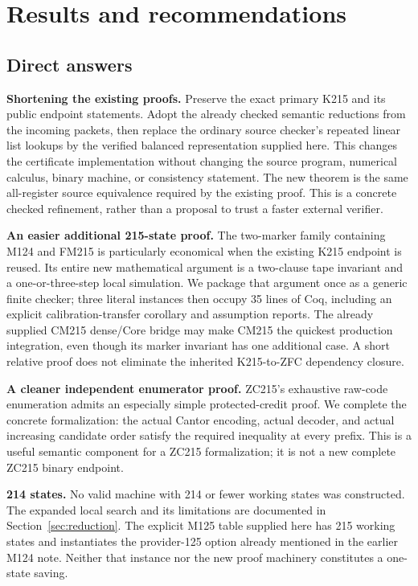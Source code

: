 \section{Results and recommendations}

\subsection{Direct answers}

\textbf{Shortening the existing proofs.} Preserve the exact primary K215 and
its public endpoint statements. Adopt the already checked semantic reductions
from the incoming packets, then replace the ordinary source checker's repeated
linear list lookups by the verified balanced representation supplied here.
This changes the certificate implementation without changing the source
program, numerical calculus, binary machine, or consistency statement.
The new theorem is the same all-register source equivalence required by the
existing proof. This is a concrete checked refinement, rather than a proposal
to trust a faster external verifier.

\textbf{An easier additional 215-state proof.} The two-marker family containing
M124 and FM215 is particularly economical when the existing K215 endpoint is
reused. Its entire new mathematical argument is a two-clause tape invariant
and a one-or-three-step local simulation. We package that argument once as
a generic finite checker; three literal instances then occupy 35 lines of
Coq, including an explicit calibration-transfer corollary and assumption
reports. The already supplied CM215 dense/Core bridge may make CM215 the
quickest production integration, even though its marker invariant has one
additional case. A short relative proof does not eliminate the inherited
K215-to-ZFC dependency closure.

\textbf{A cleaner independent enumerator proof.} ZC215's exhaustive raw-code
enumeration admits an especially simple protected-credit proof. We complete
the concrete formalization: the actual Cantor encoding, actual decoder, and
actual increasing candidate order satisfy the required inequality at every
prefix. This is a useful semantic component for a ZC215 formalization; it is
not a new complete ZC215 binary endpoint.

\textbf{214 states.} No valid machine with 214 or fewer working states was
constructed. The expanded local search and its limitations are documented in
Section~\ref{sec:reduction}. The explicit M125 table supplied here has 215
working states and instantiates the provider-125 option already mentioned in
the earlier M124 note. Neither that instance nor the new proof machinery
constitutes a one-state saving.

